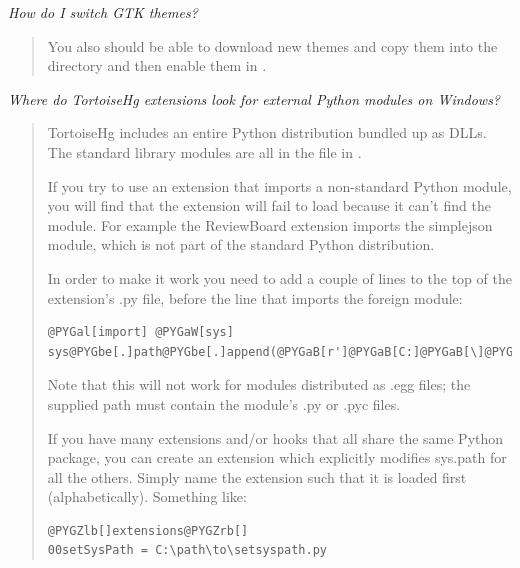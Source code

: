 \documentclass[letterpaper,10pt,english]{manual}
\begin{document}
\emph{How do I switch GTK themes?}
\begin{quote}

You also should be able to download new themes and copy them into
the  directory and then enable them in
.
\end{quote}

\emph{Where do TortoiseHg extensions look for external Python modules on Windows?}
\begin{quote}

TortoiseHg includes an entire Python distribution bundled up as
DLLs. The standard library modules are all in the
 file in .

If you try to use an extension that imports a non-standard Python
module, you will find that the extension will fail to load because
it can't find the module. For example the ReviewBoard extension
imports the simplejson module, which is not part of the standard
Python distribution.

In order to make it work you need to add a couple of lines to the
top of the extension's .py file, before the line that imports the
foreign module:

\begin{Verbatim}[commandchars=@\[\]]
@PYGal[import] @PYGaW[sys]
sys@PYGbe[.]path@PYGbe[.]append(@PYGaB[r']@PYGaB[C:]@PYGaB[\]@PYGaB[path]@PYGaB[\]@PYGaB[to]@PYGaB[\]@PYGaB[module]@PYGaB['])
\end{Verbatim}

Note that this will not work for modules distributed as .egg files;
the supplied path must contain the module's .py or .pyc files.

If you have many extensions and/or hooks that all share the same
Python package, you can create an extension which explicitly
modifies sys.path for all the others.  Simply name the extension
such that it is loaded first (alphabetically).  Something like:

\begin{Verbatim}[commandchars=@\[\]]
@PYGZlb[]extensions@PYGZrb[]
00setSysPath = C:\path\to\setsyspath.py
\end{Verbatim}
\end{quote}
\end{document}
